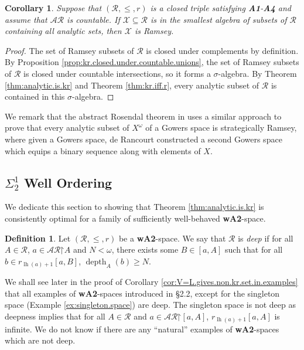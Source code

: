 \documentclass[11pt,reqno]{amsart}
\theoremstyle{plain}
\numberwithin{equation}{section}
\newtheorem{corollary}[theorem]{Corollary}
\theoremstyle{definition}
\newtheorem{definition}[theorem]{Definition}
\newcommand{\func}{\operatorname}
\newcommand{\cal}{\mathcal}
\newcommand{\restrictedto}{\mathord{\upharpoonright}}
\newcommand{\X}{\cal{X}}
\newcommand{\lh}{\func{lh}}
\newcommand{\depth}{\func{depth}}
\let\Sec\S
\renewcommand{\S}{\mathcal{S}}
\begin{document}
\begin{corollary}
\label{cor:analytically.measurable.is.ramsey}
    Suppose that $(\cal{R},\leq,r)$ is a closed triple satisfying \textbf{A1}-\textbf{A4} and assume that $\cal{AR}$ is countable. If $\X \subseteq \cal{R}$ is in the smallest algebra of subsets of $\cal{R}$ containing all analytic sets, then $\X$ is Ramsey.
\end{corollary}

\begin{proof}
    The set of Ramsey subsets of $\cal{R}$ is closed under complements by definition. By Proposition \ref{prop:kr.closed.under.countable.unions}, the set of Ramsey subsets of $\cal{R}$ is closed under countable intersections, so it forms a $\sigma$-algebra. By Theorem \ref{thm:analytic.is.kr} and Theorem \ref{thm:kr.iff.r}, every analytic subset of $\cal{R}$ is contained in this $\sigma$-algebra.
\end{proof}

We remark that the abstract Rosendal theorem in \cite{d20} uses a similar approach to prove that every analytic subset of $X^\omega$ of a Gowers space is strategically Ramsey, where given a Gowers space, de Rancourt constructed a second Gowers space which equips a binary sequence along with elements of $X$.

\subsection{\texorpdfstring{$\Sigma_2^1$ Well Ordering}{Sigma\_2\^1 Well Ordering}}
We dedicate this section to showing that Theorem \ref{thm:analytic.is.kr} is consistently optimal for a family of sufficiently well-behaved \textbf{wA2}-space. 

\begin{definition}
    Let $(\cal{R},\leq,r)$ be a \textbf{wA2}-space. We say that $\cal{R}$ is \emph{deep} if for all $A \in \cal{R}$, $a \in \cal{AR}\restrictedto A$ and $N < \omega$, there exists some $B \in [a,A]$ such that for all $b \in r_{\lh(a)+1}[a,B]$, $\depth_A(b) \geq N$.
\end{definition}

We shall see later in the proof of Corollary \ref{cor:V=L.gives.non.kr.set.in.examples} that all examples of \textbf{wA2}-spaces introduced in \Sec2.2, except for the singleton space (Example \ref{ex:singleton.space}) are deep. The singleton space is not deep as deepness implies that for all $A \in \cal{R}$ and $a \in \cal{AR}\restrictedto[a,A]$, $r_{\lh(a)+1}[a,A]$ is infinite. We do not know if there are any ``natural'' examples of \textbf{wA2}-spaces which are not deep.
\end{document}
